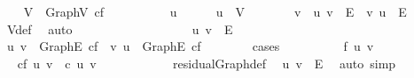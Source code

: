 \begin{isabellebody}
%
\isatagproof
{}\isamarkupfalse%
\isanewline
\ \ \isamarkupfalse%
\ {\isachardoublequoteopen}V\ {\isasymsubseteq}\ Graph{\isachardot}V\ cf{\isachardoublequoteclose}\isanewline
\ \ \isamarkupfalse%
\ \isanewline
\ \ \ \ \isamarkupfalse%
\ u\isanewline
\ \ \ \ \isamarkupfalse%
\ {\isachardoublequoteopen}u\ {\isasymin}\ V{\isachardoublequoteclose}\isanewline
\ \ \ \ \isamarkupfalse%
\ \isamarkupfalse%
\ v\ \ {\isachardoublequoteopen}{\isacharparenleft}u{\isacharcomma}\ v{\isacharparenright}\ {\isasymin}\ E\ {\isasymor}\ {\isacharparenleft}v{\isacharcomma}\ u{\isacharparenright}\ {\isasymin}\ E{\isachardoublequoteclose}\ \isamarkupfalse%
\ V{\isacharunderscore}def\ \isamarkupfalse%
\ auto\isanewline
\ \ \ \ \isanewline
\ \ \ \ \isamarkupfalse%
\ \isacommand{{\isacharbraceleft}}\isamarkupfalse%
\isanewline
\ \ \ \ \ \ \isamarkupfalse%
\ {\isachardoublequoteopen}{\isacharparenleft}u{\isacharcomma}\ v{\isacharparenright}\ {\isasymin}\ E{\isachardoublequoteclose}\isanewline
\ \ \ \ \ \ \isamarkupfalse%
\ \isamarkupfalse%
\ {\isachardoublequoteopen}{\isacharparenleft}u{\isacharcomma}\ v{\isacharparenright}\ {\isasymin}\ Graph{\isachardot}E\ cf\ {\isasymor}\ {\isacharparenleft}v{\isacharcomma}\ u{\isacharparenright}\ {\isasymin}\ Graph{\isachardot}E\ cf{\isachardoublequoteclose}\isanewline
\ \ \ \ \ \ \isamarkupfalse%
\ {\isacharparenleft}cases{\isacharparenright}\isanewline
\ \ \ \ \ \ \ \ \isamarkupfalse%
\ {\isachardoublequoteopen}f\ {\isacharparenleft}u{\isacharcomma}\ v{\isacharparenright}\ {\isacharequal}\ {}{\isachardoublequoteclose}\isanewline
\ \ \ \ \ \ \ \ \isamarkupfalse%
\ \isamarkupfalse%
\ {\isachardoublequoteopen}cf\ {\isacharparenleft}u{\isacharcomma}\ v{\isacharparenright}\ {\isacharequal}\ c\ {\isacharparenleft}u{\isacharcomma}\ v{\isacharparenright}{\isachardoublequoteclose}\isanewline
\ \ \ \ \ \ \ \ \ \ \isamarkupfalse%
\ residualGraph{\isacharunderscore}def\ \isamarkupfalse%
\ {\isacharbackquoteopen}{\isacharparenleft}u{\isacharcomma}\ v{\isacharparenright}\ {\isasymin}\ E{\isacharbackquoteclose}\ \isamarkupfalse%
\ {\isacharparenleft}auto\ simp{\isacharcolon}{\isacharparenright}\isanewline
\ \ \ \ \ \ \ \ \isamarkupfalse%
\ \isamarkupfalse%

\end{isabellebody}
